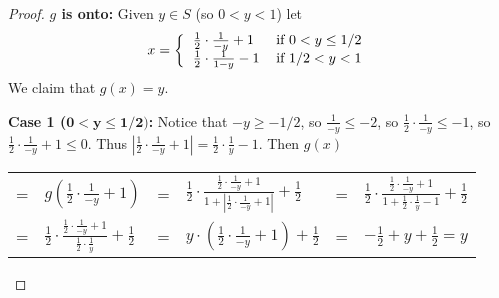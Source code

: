 \documentclass[14pt]{extarticle}
\newcommand{\dps}{\displaystyle}
\begin{document}
\begin{proof}
    {\bf $g$ is onto:} Given \(y \in S\) (so \(0 < y < 1\)) let
    \[
        x =
        \left\{
        \begin{tabular}{ll}
            \(\frac{1}{2} \cdot \frac{1}{-y} + 1\)  & if \(0 < y \leq 1/2\) \\
            \(\frac{1}{2} \cdot \frac{1}{1-y} - 1\) & if \(1/2 < y < 1\)
        \end{tabular}
        \right.
    \]
    We claim that \(g(x) = y\).

        {\bf Case 1 (\(\bm{0 < y \leq 1/2})\):} Notice that \(-y \geq -1/2\), so \(\frac{1}{-y} \leq -2\), so \(\frac{1}{2}
    \cdot \frac{1}{-y} \leq -1\), so \(\frac{1}{2} \cdot \frac{1}{-y} + 1 \leq 0\). Thus \(\left|\frac{1}{2} \cdot
    \frac{1}{-y} + 1 \right| = \frac{1}{2} \cdot \frac{1}{y} - 1\). Then $g(x)$
    \begin{center}
        \begin{tabular}{llllll}
            =                                                                                       & \(\dps g\left(\frac{1}{2} \cdot \frac{1}{-y} + 1\right)\)                                                       & =                        & \(\dps \frac{1}{2} \cdot \frac{\frac{1}{2} \cdot
            \frac{1}{-y} + 1}{1 + \left|\frac{1}{2} \cdot \frac{1}{-y} + 1 \right|} + \frac{1}{2}\) & =                                                                                                               & \(\dps \frac{1}{2} \cdot
            \frac{\frac{1}{2} \cdot \frac{1}{-y} + 1}{1 + \frac{1}{2} \cdot \frac{1}{y} - 1} + \frac{1}{2}\)                                                                                                                                                                                        \\
            =                                                                                       & \(\dps \frac{1}{2} \cdot \frac{\frac{1}{2}\cdot\frac{1}{-y} + 1}{\frac{1}{2} \cdot \frac{1}{y}} + \frac{1}{2}\) &
            =                                                                                       & \(\dps y \cdot \left(\frac{1}{2}\cdot\frac{1}{-y} + 1\right) + \frac{1}{2}\)                                    & =                        & \(\dps -\frac{1}{2} + y +
            \frac{1}{2} = y\)
        \end{tabular}
    \end{center}


\end{proof}
\end{document}
